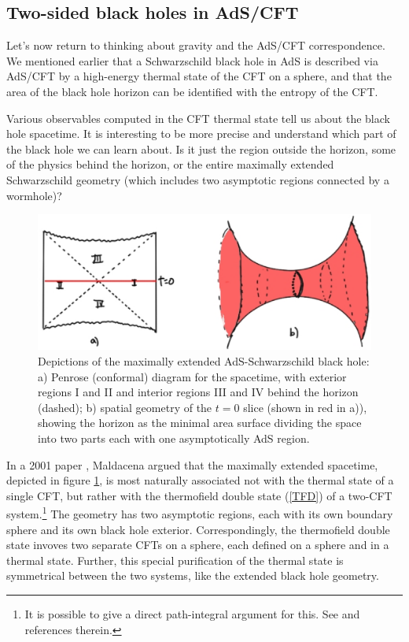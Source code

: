 \documentclass[12pt,epsf]{article}
\begin{document}
\subsection{Two-sided black holes in AdS/CFT}

Let's now return to thinking about gravity and the AdS/CFT correspondence. We mentioned earlier that a Schwarzschild black hole in AdS is described via AdS/CFT by a high-energy thermal state of the CFT on a sphere, and that the area of the black hole horizon can be identified with the entropy of the CFT.

Various observables computed in the CFT thermal state tell us about the black hole spacetime. It is interesting to be more precise and understand which part of the black hole we can learn about. Is it just the region outside the horizon, some of the physics behind the horizon, or the entire  maximally extended Schwarzschild geometry (which includes two asymptotic regions connected by a wormhole)?

\begin{figure}
\centering
\includegraphics[width=\textwidth]{MaxBH.eps}
\caption{Depictions of the maximally extended AdS-Schwarzschild black hole: a) Penrose (conformal) diagram for the spacetime, with exterior regions I and II and interior regions III and IV behind the horizon (dashed); b) spatial geometry of the $t=0$ slice (shown in red in a)), showing the horizon as the minimal area surface dividing the space into two parts each with one asymptotically AdS region. }
\label{MaxBH}
\end{figure}


In a 2001 paper \cite{Maldacena:2001kr}, Maldacena argued that the maximally extended spacetime, depicted in figure \ref{MaxBH}, is most naturally associated not with the thermal state of a single CFT, but rather with the thermofield double state (\ref{TFD}) of a two-CFT system.\footnote{It is possible to give a direct path-integral argument for this. See \cite{Balasubramanian:2014hda} and references therein.} The geometry has two asymptotic regions, each with its own boundary sphere and its own black hole exterior. Correspondingly, the thermofield double state invoves two separate CFTs on a sphere, each defined on a sphere and in a thermal state. Further, this special purification of the thermal state is symmetrical between the two systems, like the extended black hole geometry.
\end{document}
